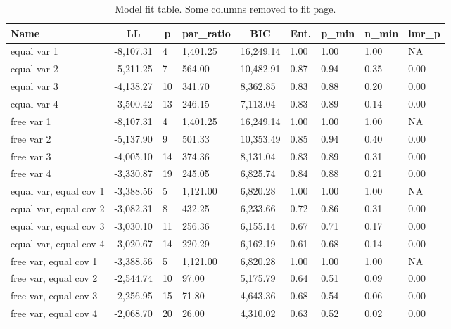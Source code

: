 \documentclass[
  man,floatsintext]{apa6}
\begin{document}
\begin{table}[tbp]

\begin{center}
\begin{threeparttable}

\caption{\label{tab:tabfit}Model fit table. Some columns removed to fit page.}

\begin{tabular}{lllllllll}
\toprule
Name & \multicolumn{1}{c}{LL} & \multicolumn{1}{c}{p} & \multicolumn{1}{c}{par\_ratio} & \multicolumn{1}{c}{BIC} & \multicolumn{1}{c}{Ent.} & \multicolumn{1}{c}{p\_min} & \multicolumn{1}{c}{n\_min} & \multicolumn{1}{c}{lmr\_p}\\
\midrule
equal var 1 & -8,107.31 & 4 & 1,401.25 & 16,249.14 & 1.00 & 1.00 & 1.00 & NA\\
equal var 2 & -5,211.25 & 7 & 564.00 & 10,482.91 & 0.87 & 0.94 & 0.35 & 0.00\\
equal var 3 & -4,138.27 & 10 & 341.70 & 8,362.85 & 0.83 & 0.88 & 0.20 & 0.00\\
equal var 4 & -3,500.42 & 13 & 246.15 & 7,113.04 & 0.83 & 0.89 & 0.14 & 0.00\\
free var 1 & -8,107.31 & 4 & 1,401.25 & 16,249.14 & 1.00 & 1.00 & 1.00 & NA\\
free var 2 & -5,137.90 & 9 & 501.33 & 10,353.49 & 0.85 & 0.94 & 0.40 & 0.00\\
free var 3 & -4,005.10 & 14 & 374.36 & 8,131.04 & 0.83 & 0.89 & 0.31 & 0.00\\
free var 4 & -3,330.87 & 19 & 245.05 & 6,825.74 & 0.84 & 0.88 & 0.21 & 0.00\\
equal var, equal cov 1 & -3,388.56 & 5 & 1,121.00 & 6,820.28 & 1.00 & 1.00 & 1.00 & NA\\
equal var, equal cov 2 & -3,082.31 & 8 & 432.25 & 6,233.66 & 0.72 & 0.86 & 0.31 & 0.00\\
equal var, equal cov 3 & -3,030.10 & 11 & 256.36 & 6,155.14 & 0.67 & 0.71 & 0.17 & 0.00\\
equal var, equal cov 4 & -3,020.67 & 14 & 220.29 & 6,162.19 & 0.61 & 0.68 & 0.14 & 0.00\\
free var, equal cov 1 & -3,388.56 & 5 & 1,121.00 & 6,820.28 & 1.00 & 1.00 & 1.00 & NA\\
free var, equal cov 2 & -2,544.74 & 10 & 97.00 & 5,175.79 & 0.64 & 0.51 & 0.09 & 0.00\\
free var, equal cov 3 & -2,256.95 & 15 & 71.80 & 4,643.36 & 0.68 & 0.54 & 0.06 & 0.00\\
free var, equal cov 4 & -2,068.70 & 20 & 26.00 & 4,310.02 & 0.63 & 0.52 & 0.02 & 0.00\\

\end{tabular}
\end{threeparttable}
\end{center}
\end{table}
\end{document}
